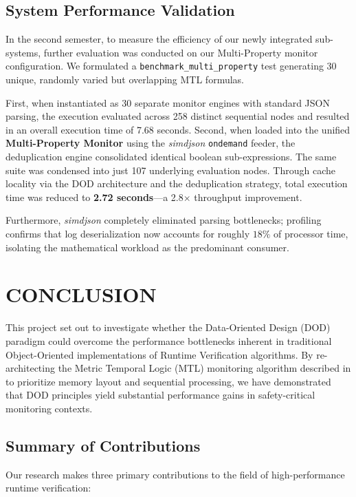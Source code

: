 \documentclass[a4paper,12pt]{report}
\begin{document}
\section{System Performance Validation}

In the second semester, to measure the efficiency of our newly integrated sub-systems, further evaluation was conducted on our Multi-Property monitor configuration. We formulated a \texttt{benchmark\_multi\_property} test generating 30 unique, randomly varied but overlapping MTL formulas. 

First, when instantiated as 30 separate monitor engines with standard JSON parsing, the execution evaluated across 258 distinct sequential nodes and resulted in an overall execution time of 7.68 seconds. 
Second, when loaded into the unified \textbf{Multi-Property Monitor} using the \textit{simdjson} \texttt{ondemand} feeder, the deduplication engine consolidated identical boolean sub-expressions. The same suite was condensed into just 107 underlying evaluation nodes. Through cache locality via the DOD architecture and the deduplication strategy, total execution time was reduced to \textbf{2.72 seconds}—a 2.8$\times$ throughput improvement.

Furthermore, \textit{simdjson} completely eliminated parsing bottlenecks; profiling confirms that log deserialization now accounts for roughly $18\%$ of processor time, isolating the mathematical workload as the predominant consumer.

\chapter{CONCLUSION}

This project set out to investigate whether the Data-Oriented Design (DOD) paradigm could overcome the performance bottlenecks inherent in traditional Object-Oriented implementations of Runtime Verification algorithms. By re-architecting the Metric Temporal Logic (MTL) monitoring algorithm described in \cite{Ulus19} to prioritize memory layout and sequential processing, we have demonstrated that DOD principles yield substantial performance gains in safety-critical monitoring contexts.

\section{Summary of Contributions}

Our research makes three primary contributions to the field of high-performance runtime verification:
\end{document}

